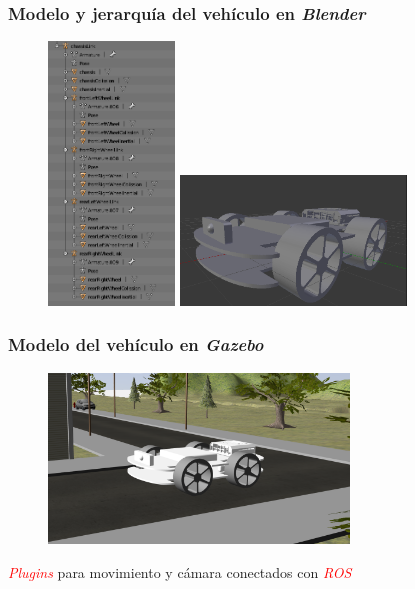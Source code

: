 \documentclass{beamer}
\begin{document}
\begin{frame}
	\frametitle{Modelo y jerarquía del vehículo en \textit{Blender}}
	\begin{figure}
		\centering
		\includegraphics[height=7cm]{figs/phobosDiagram}\hspace{0.1cm}
		\includegraphics[width=6cm]{figs/blenderModel}
	\end{figure}
\end{frame}

\begin{frame}
	\frametitle{Modelo del vehículo en \textit{Gazebo}}
	\begin{figure}
		\centering
		\includegraphics[width=8cm]{figs/modelGazebo}
	\end{figure}
	\begin{outline}
		\1 \textcolor{red}{\textit{Plugins}} para movimiento y cámara conectados con \textcolor{red}{\textit{ROS}}
	\end{outline}
\end{frame}
\end{document}
